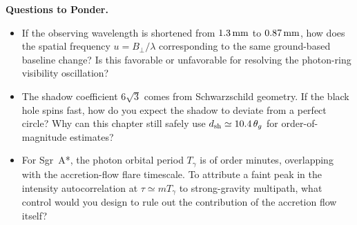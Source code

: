 \noindent\textbf{Questions to Ponder.}
\begin{itemize}
\item If the observing wavelength is shortened from \(1.3\,{\rm mm}\) to \(0.87\,{\rm mm}\), how does the spatial frequency \(u=B_\perp/\lambda\) corresponding to the same ground-based baseline change? Is this favorable or unfavorable for resolving the photon-ring visibility oscillation?
\item The shadow coefficient \(6\sqrt3\) comes from Schwarzschild geometry. If the black hole spins fast, how do you expect the shadow to deviate from a perfect circle? Why can this chapter still safely use \(d_{\rm sh}\simeq10.4\,\theta_g\) for order-of-magnitude estimates?
\item For Sgr~A*, the photon orbital period \(T_\gamma\) is of order minutes, overlapping with the accretion-flow flare timescale. To attribute a faint peak in the intensity autocorrelation at \(\tau\simeq mT_\gamma\) to strong-gravity multipath, what control would you design to rule out the contribution of the accretion flow itself?
\end{itemize}
